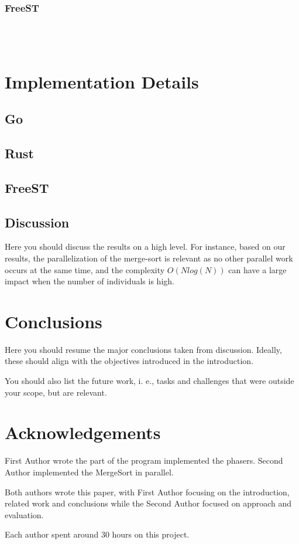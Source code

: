 \documentclass[runningheads]{llncs}
\begin{document}
\subsubsection{FreeST}\hfill\\\\
\lipsum[1]
\section{Implementation Details}
\lipsum[1]
\subsection{Go}
\lipsum[1]
\subsection{Rust}
\lipsum[1]
\subsection{FreeST}
\lipsum[1]
\subsection{Discussion}
Here you should discuss the results on a high level. For instance, based on our results, the parallelization of the merge-sort is relevant as no other parallel work occurs at the same time, and the complexity $O(N log(N))$ can have a large impact when the number of individuals is high.
\section{Conclusions}
Here you should resume the major conclusions taken from discussion. Ideally, these should align with the objectives introduced in the introduction.


You should also list the future work, i. e., tasks and challenges that were outside your scope, but are relevant.
\section*{Acknowledgements}
First Author wrote the part of the program implemented the phasers. Second Author implemented the MergeSort in parallel. 

Both authors wrote this paper, with First Author focusing on the introduction, related work and conclusions while the Second Author focused on approach and evaluation.

Each author spent around 30 hours on this project.


\end{document}
